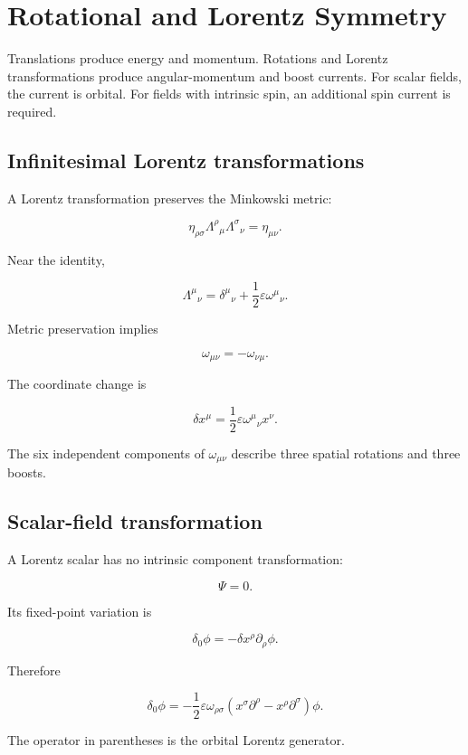 \section{Rotational and Lorentz Symmetry}
\label{sec:rotational_lorentz_symmetry}

Translations produce energy and momentum. Rotations and Lorentz transformations produce angular-momentum and boost currents. For scalar fields, the current is orbital. For fields with intrinsic spin, an additional spin current is required.

\subsection{Infinitesimal Lorentz transformations}

A Lorentz transformation preserves the Minkowski metric:

\[
\eta_{\rho\sigma}
\Lambda^{\rho}{}_{\mu}
\Lambda^{\sigma}{}_{\nu}
=
\eta_{\mu\nu}.
\]

Near the identity,

\[
\Lambda^{\mu}{}_{\nu}
=
\delta^{\mu}{}_{\nu}
+
\frac{1}{2}
\varepsilon
\omega^{\mu}{}_{\nu}.
\]

Metric preservation implies

\[
\boxed{
\omega_{\mu\nu}
=
-\omega_{\nu\mu}
}.
\]

The coordinate change is

\[
\boxed{
\delta x^{\mu}
=
\frac{1}{2}
\varepsilon
\omega^{\mu}{}_{\nu}x^{\nu}
}.
\]

The six independent components of \(\omega_{\mu\nu}\) describe three spatial rotations and three boosts.

\subsection{Scalar-field transformation}

A Lorentz scalar has no intrinsic component transformation:

\[
\Psi=0.
\]

Its fixed-point variation is

\[
\delta_0\phi
=
-\delta x^{\rho}\partial_{\rho}\phi.
\]

Therefore

\[
\boxed{
\delta_0\phi
=
-\frac{1}{2}
\varepsilon
\omega_{\rho\sigma}
\left(
x^{\sigma}\partial^{\rho}
-
x^{\rho}\partial^{\sigma}
\right)\phi
}.
\]

The operator in parentheses is the orbital Lorentz generator.

